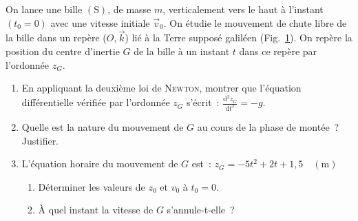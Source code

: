 \begin{minipage}[t][][t]{0.82\linewidth}
    On lance une bille $\mathrm{(S)}$, de masse $m$, verticalement vers le haut
    à l'instant $(t_{0}=0)$ avec une vitesse initiale $\vec{v}_{0}$. On étudie
    le mouvement de chute libre de la bille dans un repère ($O,\vec{k}$) lié à
    la Terre supposé galiléen (Fig.~\ref{fig:bille}). On repère la position du
    centre d'inertie $G$ de la bille à un instant $t$ dans ce repère par
    l'ordonnée $z_{G}$.

\begin{enumerate}
    \item En appliquant la deuxième loi de \textsc{Newton}, montrer que
          l'équation différentielle vérifiée par l'ordonnée $z_{G}$ s'écrit~:
          $\frac{\mathrm{d}^{2} z_{G}}{\mathrm{d} t^{2}}=-g$.
    \item Quelle est la nature du mouvement de $G$ au cours de la phase de
          montée~? Justifier.
    \item L'équation horaire du mouvement de $G$ est~:
          $z_{G}=-5 t^{2}+2 t+1,5 \quad (\unit{\m})$
          \begin{enumerate}
              \item Déterminer les valeurs de $z_{0}$ et $v_{0}$ à $t_{0}=0$.
              \item À quel instant la vitesse de $G$ s'annule-t-elle~?
          \end{enumerate}
\end{enumerate}
\end{minipage}
\hfill
\begin{minipage}[t][][t]{0.16\linewidth}
\begin{figure}[H]
    \centering
    \caption{}
    \label{fig:bille}
\end{figure}
\end{minipage}


